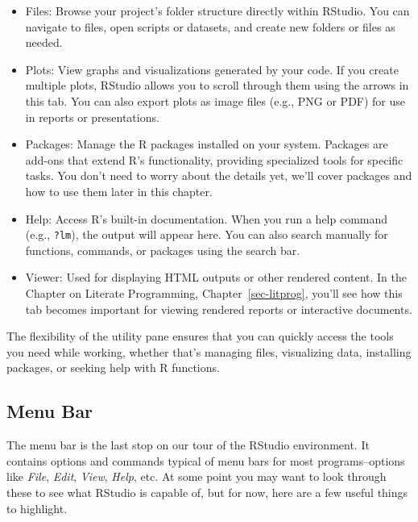 \documentclass[
  letterpaper,
]{book}
\providecommand{\tightlist}{%
  \setlength{\itemsep}{0pt}\setlength{\parskip}{0pt}}\usepackage{longtable,booktabs,array}
\begin{document}
\begin{itemize}
\tightlist
\item
  Files: Browse your project's folder structure directly within RStudio.
  You can navigate to files, open scripts or datasets, and create new
  folders or files as needed.
\item
  Plots: View graphs and visualizations generated by your code. If you
  create multiple plots, RStudio allows you to scroll through them using
  the arrows in this tab. You can also export plots as image files
  (e.g., PNG or PDF) for use in reports or presentations.
\item
  Packages: Manage the R packages installed on your system. Packages are
  add-ons that extend R's functionality, providing specialized tools for
  specific tasks. You don't need to worry about the details yet, we'll
  cover packages and how to use them later in this chapter.
\item
  Help: Access R's built-in documentation. When you run a help command
  (e.g., \texttt{?lm}), the output will appear here. You can also search
  manually for functions, commands, or packages using the search bar.
\item
  Viewer: Used for displaying HTML outputs or other rendered content. In
  the Chapter on Literate Programming, Chapter~\ref{sec-litprog}, you'll
  see how this tab becomes important for viewing rendered reports or
  interactive documents.
\end{itemize}

The flexibility of the utility pane ensures that you can quickly access
the tools you need while working, whether that's managing files,
visualizing data, installing packages, or seeking help with R functions.

\subsection{Menu Bar}\label{menu-bar}

The menu bar is the last stop on our tour of the RStudio environment. It
contains options and commands typical of menu bars for most
programs--options like \emph{File}, \emph{Edit}, \emph{View},
\emph{Help}, etc. At some point you may want to look through these to
see what RStudio is capable of, but for now, here are a few useful
things to highlight.
\end{document}
